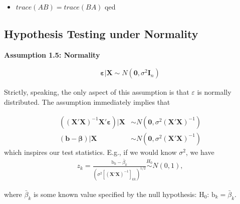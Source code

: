 \documentclass[
]{book}
\providecommand{\tightlist}{%
  \setlength{\itemsep}{0pt}\setlength{\parskip}{0pt}}
\begin{document}
\begin{itemize}
\tightlist
\item
  \(trace(AB)=trace(BA)\)
  qed
\end{itemize}

\hfill\break

\hypertarget{Testing}{%
\subsection{Hypothesis Testing under Normality}\label{Testing}}

\textbf{Assumption 1.5: Normality}

\begin{align*}
  \boldsymbol{\varepsilon}|\mathbf{X}\sim N(\mathbf{0},\sigma^2 \mathbf{I}_n)
\end{align*}

Strictly, speaking, the only aspect of this assumption is that \(\varepsilon\) is
normally distributed. The assumption immediately implies that

\begin{align*}
  ((\mathbf{X}'\mathbf{X})^{-1}\mathbf{X}'\boldsymbol{\varepsilon})|\mathbf{X}&\sim N(\mathbf{0},\sigma^2 (\mathbf{X}'\mathbf{X})^{-1})\\
  (\mathbf{b}-\boldsymbol{\beta})|\mathbf{X}&\sim N(\mathbf{0},\sigma^2 (\mathbf{X}'\mathbf{X})^{-1})
\end{align*}
which inspires our test statistics. E.g., if we would know \(\sigma^2\),
we have
\begin{align*}
  z_k=\frac{\text{b}_k-\bar{\beta}_k}{\left(\sigma^2\left[(\mathbf{X}'\mathbf{X})^{-1}\right]_{kk}\right)^{1/2}}\overset{H_0}{\sim} N(0,1),
\end{align*}

where \(\bar{\beta}_k\) is some known value specified by the null
hypothesis: \(\text{H}_0\): \(\text{b}_k=\bar{\beta}_k\).
\end{document}
